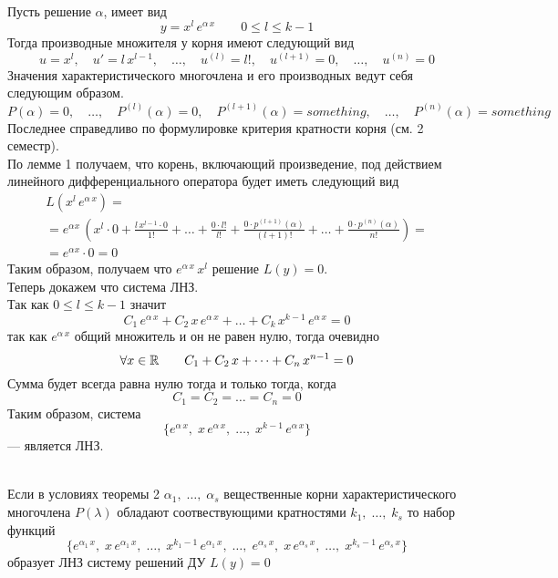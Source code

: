 \begin{Proof}~\\
    Пусть решение $\alpha$, имеет вид
    \[
        y=x^l\,e^{\alpha\,x} \qquad 0 \leqslant l \leqslant k-1
    \]
    Тогда производные множителя у корня имеют следующий вид
    \[
        u=x^l, \quad u'=l\,x^{l-1},\quad \dots,\quad u^{(l)}=l!,\quad u^{(l+1)}=0,\quad \dots,\quad u^{(n)}=0
    \]
    Значения характеристического многочлена и его производных ведут себя следующим образом.   
    \[
        P(\alpha)=0, \quad \dots,\quad P^{(l)}(\alpha)=0,\quad P^{(l+1)}(\alpha)=something,\quad \dots,\quad P^{(n)}(\alpha)=something
    \]
    Последнее справедливо по формулировке критерия кратности корня (см. 2 семестр).\\
    
    По лемме 1 получаем, что корень, включающий произведение, под действием линейного дифференциального оператора будет иметь следующий вид
    \begin{multline*}
        L(x^l\,e^{\alpha\,x}) =\\
        = e^{\alpha x}\, \left(x^l\cdot 0+\frac{l\,x^{l-1}\cdot0}{1!}+\dots+\frac{0\cdot l!}{l!}+\frac{0\cdot p^{(l+1)}(\alpha)}{(l+1)!}+ \dots + \frac{0\cdot p^{(n)}(\alpha)}{n!} \right) = \\
        = e^{\alpha x} \cdot 0=0 
    \end{multline*}
    Таким образом, получаем что $e^{\alpha\,x}\,x^l$ решение $L(y)=0$.\\
    
    Теперь докажем что система ЛНЗ.\\
    Так как $0 \leqslant l \leqslant k-1$ значит
    \[
        C_1\,e^{\alpha\,x}+C_2\,x\,e^{\alpha\,x}+\dots+C_k\,x^{k-1}\,e^{\alpha\,x}=0
    \]
    так как $e^{\alpha\,x}$ общий множитель и он не равен нулю, тогда очевидно
    \[
        \forall x \in \mathbb{R} \qquad C_1+C_2\,x+\dots+C_n\,x^{n-1}=0
    \]
    Сумма будет всегда равна нулю тогда и только тогда, когда
    \[
        C_1=C_2=\dots=C_n=0
    \]
    Таким образом, система
    \[
        \{e^{\alpha\,x},\; x\,e^{\alpha\,x},\; \dots,\; x^{k-1}\,e^{\alpha\,x}\}
    \] 
    --- является ЛНЗ.
\end{Proof}

\begin{Th}~\\
    Если в условиях теоремы 2 $\alpha_1,\; \dots,\; \alpha_s$ вещественные корни характеристического многочлена $P(\lambda)$ обладают соотвествующими кратностями $k_1,\; \dots,\; k_s$ то набор функций
    \[
        \{e^{\alpha_1\,x},\; x\,e^{\alpha_1\,x},\; \dots,\; x^{k_1-1}\,e^{\alpha_1\,x},\; \dots,\; e^{\alpha_s\,x},\; x\,e^{\alpha_s\,x},\; \dots,\; x^{k_s-1}\,e^{\alpha_s\,x}\}
    \]
    образует ЛНЗ систему решений ДУ $L(y)=0$
\end{Th}

